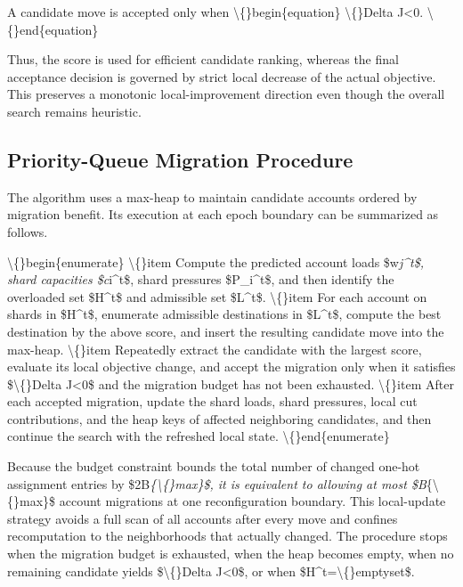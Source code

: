 \documentclass{article}
\begin{document}
A candidate move is accepted only when
\textbackslash\{\}begin\{equation\}
\textbackslash\{\}Delta J<0.
\textbackslash\{\}end\{equation\}

Thus, the score is used for efficient candidate ranking, whereas the final acceptance decision is governed by strict local decrease of the actual objective. This preserves a monotonic local-improvement direction even though the overall search remains heuristic.

\subsection{Priority-Queue Migration Procedure}\label{sec:priority-queue-migration-procedure}

The algorithm uses a max-heap to maintain candidate accounts ordered by migration benefit. Its execution at each epoch boundary can be summarized as follows.

\textbackslash\{\}begin\{enumerate\}
\textbackslash\{\}item Compute the predicted account loads \$w\emph{j^t\$, shard capacities \$c}i^t\$, shard pressures \$P\_i^t\$, and then identify the overloaded set \$H^t\$ and admissible set \$L^t\$.
\textbackslash\{\}item For each account on shards in \$H^t\$, enumerate admissible destinations in \$L^t\$, compute the best destination by the above score, and insert the resulting candidate move into the max-heap.
\textbackslash\{\}item Repeatedly extract the candidate with the largest score, evaluate its local objective change, and accept the migration only when it satisfies \$\textbackslash\{\}Delta J<0\$ and the migration budget has not been exhausted.
\textbackslash\{\}item After each accepted migration, update the shard loads, shard pressures, local cut contributions, and the heap keys of affected neighboring candidates, and then continue the search with the refreshed local state.
\textbackslash\{\}end\{enumerate\}

Because the budget constraint bounds the total number of changed one-hot assignment entries by \$2B\emph{\{\textbackslash\{\}max\}\$, it is equivalent to allowing at most \$B}\{\textbackslash\{\}max\}\$ account migrations at one reconfiguration boundary. This local-update strategy avoids a full scan of all accounts after every move and confines recomputation to the neighborhoods that actually changed. The procedure stops when the migration budget is exhausted, when the heap becomes empty, when no remaining candidate yields \$\textbackslash\{\}Delta J<0\$, or when \$H^t=\textbackslash\{\}emptyset\$.
\end{document}
